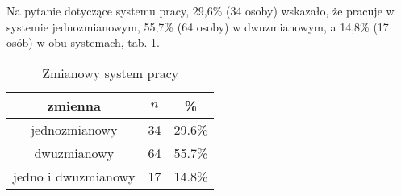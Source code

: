 Na pytanie dotyczące systemu pracy, 29,6\% (34 osoby) wskazało, że pracuje w systemie jednozmianowym, 55,7\% (64 osoby) w dwuzmianowym, a 14,8\% (17 osób) w obu systemach, tab. \ref{tab:Q4}.

\begin{table}[H]
\caption{Zmianowy system pracy}
\centering
\begin{tabular}{ | c | c | c |}
\hline
zmienna & $n$ & \% \\
\hline
jednozmianowy  &  34  & 29.6\% \\
\hline
dwuzmianowy  &  64  & 55.7\% \\
\hline
jedno i dwuzmianowy  &  17  & 14.8\% \\
\hline
\end{tabular}
\label{tab:Q4}
\end{table}

